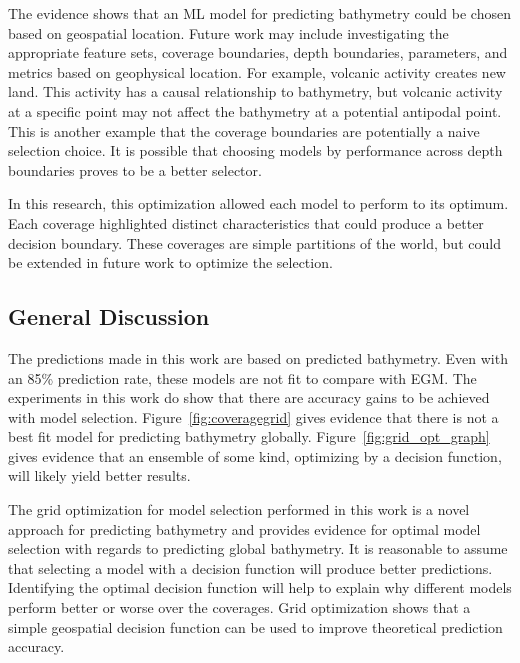 \par
The evidence shows that an \ac{ML} model for predicting bathymetry could be chosen based on geospatial location.
Future work may include investigating the appropriate feature sets, coverage boundaries, depth boundaries, parameters, and metrics based on geophysical location.
For example, volcanic activity creates new land.
This activity has a causal relationship to bathymetry, but volcanic activity at a specific point may not affect the bathymetry at a potential antipodal point.
This is another example that the coverage boundaries are potentially a naive selection choice.
It is possible that choosing models by performance across depth boundaries proves to be a better selector.
\par
In this research, this optimization allowed each model to perform to its optimum.
Each coverage highlighted distinct characteristics that could produce a better decision boundary.
These coverages are simple partitions of the world, but could be extended in future work to optimize the selection.




\subsection{General Discussion}
The predictions made in this work are based on predicted bathymetry.
Even with an 85\% prediction rate, these models are not fit to compare with \acf{EGM}.
The experiments in this work do show that there are accuracy gains to be achieved with model selection.
Figure~\ref{fig:coveragegrid} gives evidence that there is not a best fit model for predicting bathymetry globally.
Figure~\ref{fig:grid_opt_graph} gives evidence that an ensemble of some kind, optimizing by a decision function, will likely yield better results.

The grid optimization for model selection performed in this work is a novel approach for predicting bathymetry and provides evidence for optimal model selection with regards to predicting global bathymetry.
It is reasonable to assume that selecting a model with a decision function will produce better predictions.
Identifying the optimal decision function will help to explain why different models perform better or worse over the coverages.
Grid optimization shows that a simple geospatial decision function can be used to improve theoretical prediction accuracy.